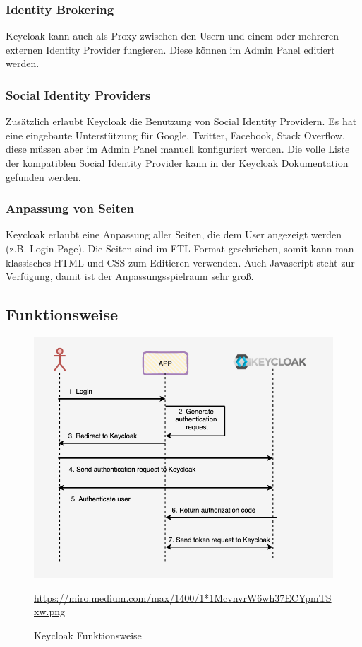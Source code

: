 \subsubsection{Identity Brokering}
Keycloak kann auch als Proxy zwischen den Usern und einem oder mehreren externen Identity Provider fungieren. Diese können im Admin Panel editiert werden. \cite{KeyCloakDZone}
\subsubsection{Social Identity Providers}
Zusätzlich erlaubt Keycloak die Benutzung von Social Identity Providern. Es hat eine eingebaute Unterstützung für Google, Twitter, Facebook, Stack Overflow, diese müssen aber 
im Admin Panel manuell konfiguriert werden. Die volle Liste der kompatiblen Social Identity Provider kann in der Keycloak Dokumentation gefunden werden. \cite{KeyCloakDZone}
\subsubsection{Anpassung von Seiten}
Keycloak erlaubt eine Anpassung aller Seiten, die dem User angezeigt werden (z.B. Login-Page). Die Seiten sind im FTL Format geschrieben, somit kann man klassisches HTML und CSS zum Editieren verwenden.
Auch Javascript steht zur Verfügung, damit ist der Anpassungsspielraum sehr groß. \cite{KeyCloakDZone}
\pagebreak

\subsection{Funktionsweise}
\begin{figure}[htp]
    \centering
    \includegraphics[scale=0.55]{pics/Keycloak-Funktionsweise2.png}
    \caption{Keycloak Funktionsweise}
    \small \url{https://miro.medium.com/max/1400/1*1McvnvrW6wh37ECYpmTSxw.png}
    \label{fig:impl:KeycloakFunc}
\end{figure}

